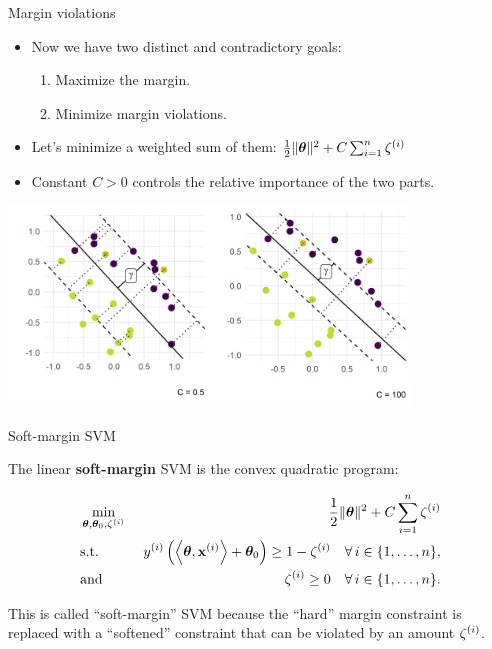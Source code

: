 \documentclass[11pt,compress,t,notes=noshow, xcolor=table]{beamer}
\begin{document}
\begin{vbframe}{Margin violations}

  \begin{itemize}
    \item Now we have two distinct and contradictory goals:
    \begin{enumerate}
      \item Maximize the margin.
      \item Minimize margin violations.
    \end{enumerate}
    \item Let's minimize a weighted sum of them: 
    $
    \frac{1}{2} \|\bm{\theta}\|^2 + C   \sum_{i=1}^n \zeta^{(i)}
    $
    \item Constant $C > 0$ controls the relative importance of the two parts.
  \end{itemize}


\begin{center}
\includegraphics[width = 0.8\textwidth ]{figure/margin_violations.png} \\
\end{center}

\end{vbframe}

\begin{vbframe}{Soft-margin SVM}

The linear \textbf{soft-margin} SVM is the convex quadratic program:

  \begin{eqnarray*}
    & \min\limits_{\bm{\theta}, \bm{\theta}_0,\zeta^{(i)}} & \frac{1}{2} \|\bm{\theta}\|^2 + C   \sum_{i=1}^n \zeta^{(i)} \\
    & \text{s.t.} & \,\, y^{(i)}  \left( \left\langle \bm{\theta}, \mathbf{x}^{(i)} \right\rangle + \bm{\theta}_0 \right) \geq 1 - \zeta^{(i)} \quad \forall\, i \in \{1, \ldots, n\},\\
    & \text{and} & \,\, \zeta^{(i)} \geq 0 \quad \forall\, i \in \{1, \ldots, n\}.\\
  \end{eqnarray*}

  This is called \enquote{soft-margin} SVM because the
  \enquote{hard} margin constraint is replaced with a \enquote{softened}
  constraint that can be violated by an amount $\zeta^{(i)}$.\\


\end{vbframe}
\end{document}
